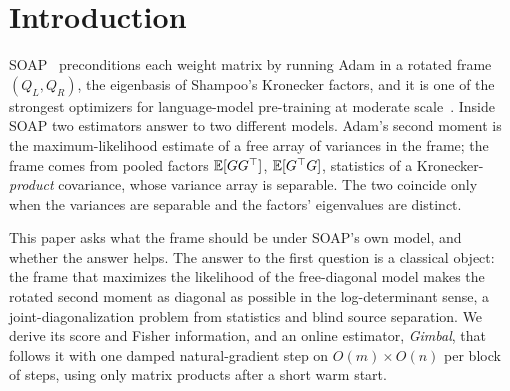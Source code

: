 \section{Introduction}
\label{sec:intro}

SOAP~\citep{vyas2024soap} preconditions each weight matrix by running Adam in a rotated frame
$(Q_L,Q_R)$, the eigenbasis of Shampoo's Kronecker factors, and it is one of the strongest
optimizers for language-model pre-training at moderate scale~\citep{wen2025fantastic,
semenov2025benchmarking}. Inside SOAP two estimators answer to two different models. Adam's
second moment is the maximum-likelihood estimate of a free array of variances in the frame; the
frame comes from pooled factors $\mathbb{E}[GG^\top]$, $\mathbb{E}[G^\top G]$, statistics of a
Kronecker-\emph{product} covariance, whose variance array is separable. The two coincide only when
the variances are separable and the factors' eigenvalues are distinct.

This paper asks what the frame should be under SOAP's own model, and whether the answer helps. The
answer to the first question is a classical object: the frame that maximizes the likelihood of the
free-diagonal model makes the rotated second moment as diagonal as possible in the log-determinant
sense, a joint-diagonalization problem from statistics and blind source separation. We derive its
score and Fisher information, and an online estimator, \emph{Gimbal}, that follows it with one damped
natural-gradient step on $O(m)\times O(n)$ per block of steps, using only matrix products after a
short warm start.

